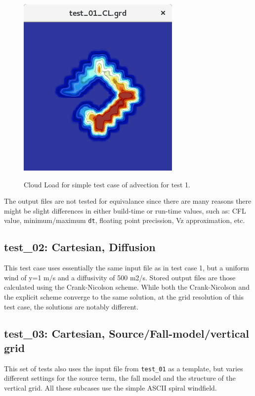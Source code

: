\begin{figure}[htbp]\vspace*{0cm}\hspace*{0cm}
\includegraphics[angle=0,scale=0.5]{Figures/Apx_Test/Test_01_CL.png}\\
\parbox{15cm}{\caption{\label{FigTest_DiffTC1_CL}
Cloud Load for simple test case of advection for test 1.
}}
\end{figure}

The output files are not tested for equivalance since there are many reasons
there might be slight differences in either build-time or run-time values,
such as: CFL value, minimum/maximum \texttt{dt}, floating point precission,
Vz approximation, etc.

\subsection{test\_02: Cartesian, Diffusion}
This test case uses essentially the same input file as in test case 1, but a
uniform wind of y=1 m/s and a diffusivity of 500 m2/s. Stored output files are
those calculated using the Crank-Nicolson scheme. While both the Crank-Nicolson
and the explicit scheme converge to the same solution, at the grid resolution of
this test case, the solutions are notably different.

\subsection{test\_03: Cartesian, Source/Fall-model/vertical grid}
This set of tests also uses the input file from \texttt{test\_01} as a template,
but varies different settings for the source term, the fall model and the
structure of the vertical grid. All these subcases use the simple
ASCII spiral windfield.

